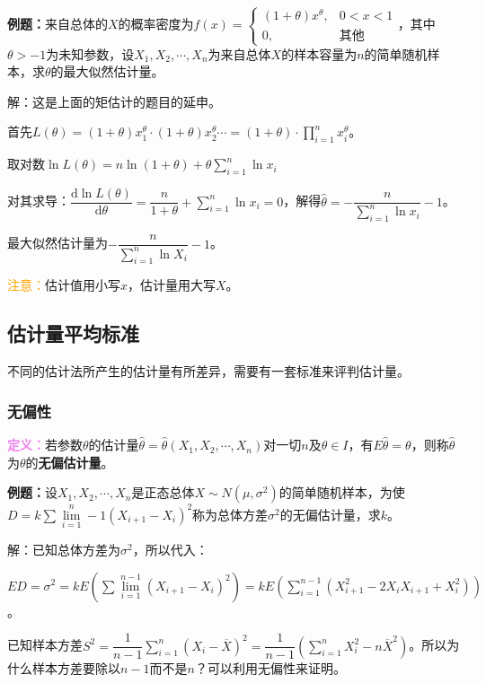 \documentclass[UTF8, 12pt]{ctexart}
\begin{document}
\textbf{例题：}来自总体的$X$的概率密度为$f(x)=\left\{\begin{array}{ll}
    (1+\theta)x^\theta, & 0<x<1 \\
    0, & \text{其他}
\end{array}\right.$，其中$\theta>-1$为未知参数，设$X_1,X_2,\cdots,X_n$为来自总体$X$的样本容量为$n$的简单随机样本，求$\theta$的最大似然估计量。

解：这是上面的矩估计的题目的延申。

首先$L(\theta)=(1+\theta)x_1^\theta\cdot(1+\theta)x_2^\theta\cdots=(1+\theta)\cdot\prod\limits_{i=1}^nx_i^\theta$。

取对数$\ln L(\theta)=n\ln(1+\theta)+\theta\sum\limits_{i=1}^n\ln x_i$

对其求导：$\dfrac{\textrm{d}\ln L(\theta)}{\textrm{d}\theta}=\dfrac{n}{1+\theta}+\sum\limits_{i=1}^n\ln x_i=0$，解得$\hat{\theta}=-\dfrac{n}{\sum\limits_{i=1}^n\ln x_i}-1$。

最大似然估计量为$-\dfrac{n}{\sum\limits_{i=1}^n\ln X_i}-1$。

\textcolor{orange}{注意：}估计值用小写$x$，估计量用大写$X$。

\subsection{估计量平均标准}

不同的估计法所产生的估计量有所差异，需要有一套标准来评判估计量。

\subsubsection{无偏性}

\textcolor{violet}{\textbf{定义：}}若参数$\theta$的估计量$\hat{\theta}=\hat{\theta}(X_1,X_2,\cdots,X_n)$对一切$n$及$\theta\in I$，有$E\hat{\theta}=\theta$，则称$\hat{\theta}$为$\theta$的\textbf{无偏估计量}。

\textbf{例题：}设$X_1,X_2,\cdots,X_n$是正态总体$X\sim N(\mu,\sigma^2)$的简单随机样本，为使$D=k\sum\lim\limits_{i=1}^n-1(X_{i+1}-X_i)^2$称为总体方差$\sigma^2$的无偏估计量，求$k$。

解：已知总体方差为$\sigma^2$，所以代入：

$ED=\sigma^2=kE(\sum\lim\limits_{i=1}^{n-1}(X_{i+1}-X_i)^2)=kE(\sum\limits_{i=1}^{n-1}(X_{i+1}^2-2X_iX_{i+1}+X_i^2))$。

已知样本方差$S^2=\dfrac{1}{n-1}\sum\limits_{i=1}^n(X_i-\overline{X})^2=\dfrac{1}{n-1}\left(\sum\limits_{i=1}^nX_i^2-n\overline{X}^2\right)$。所以为什么样本方差要除以$n-1$而不是$n$？可以利用无偏性来证明。
\end{document}
